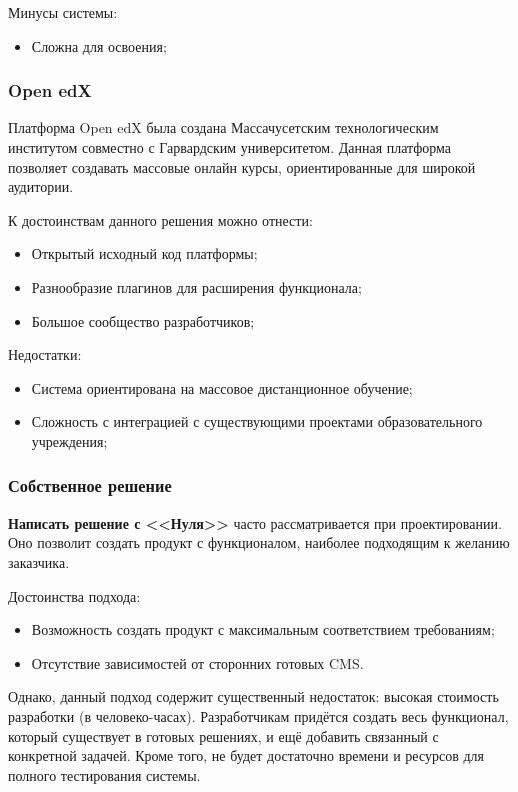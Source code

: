 \documentclass[a4paper,14pt]{article}
\begin{document}
Минусы системы:

\begin{itemize}
	\item Сложна для освоения;
\end{itemize} 


\subsubsection{Open edX} 

Платформа Open edX была создана Массачусетским технологическим институтом совместно с Гарвардским университетом\cite{edX}.
Данная платформа позволяет создавать массовые онлайн курсы, ориентированные для широкой аудитории.

К достоинствам данного решения можно отнести:

\begin{itemize}
	\item Открытый исходный код платформы;
	\item Разнообразие плагинов для расширения функционала;
	\item Большое сообщество разработчиков;
\end{itemize}

Недостатки:

\begin{itemize}
	\item Система ориентирована на массовое дистанционное обучение;
	\item Сложность с интеграцией с существующими проектами образовательного учреждения;
\end{itemize}

\subsubsection{Собственное решение} 

\textbf{Написать решение с <<Нуля>>} часто рассматривается при проектировании.
Оно позволит создать продукт с функционалом, наиболее подходящим к желанию заказчика.

Достоинства подхода:

\begin{itemize}
	\item Возможность создать продукт с максимальным соответствием требованиям;
	\item Отсутствие зависимостей от сторонних готовых CMS.
\end{itemize}

Однако, данный подход содержит существенный недостаток: высокая стоимость разработки (в человеко-часах).
Разработчикам придётся создать весь функционал, который существует в готовых решениях,  и ещё добавить связанный с конкретной задачей.
Кроме того, не будет достаточно времени и ресурсов для полного тестирования системы.
\end{document}
